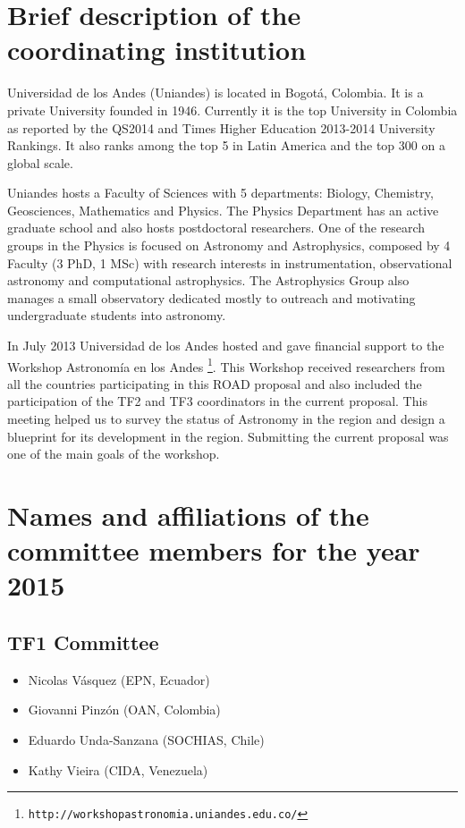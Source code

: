 \documentclass[12pt]{article}
\begin{document}
\section{Brief description of the coordinating institution}

Universidad de los Andes (Uniandes) is located in Bogotá, Colombia. It
is a private University founded in 1946. Currently it is the top
University in Colombia as reported by the QS2014 and Times
Higher Education 2013-2014 University Rankings. It also ranks among
the top 5 in Latin America and the top 300 on a global scale.    

Uniandes hosts a Faculty of Sciences with 5 departments: Biology,
Chemistry, Geosciences, Mathematics and Physics. The Physics
Department has an active graduate school and also hosts postdoctoral
researchers. One of the research groups in the Physics is focused on
Astronomy and Astrophysics, composed by 4 Faculty (3 PhD, 1 MSc) with
research interests in instrumentation, observational astronomy and
computational astrophysics. The Astrophysics Group also manages a
small observatory dedicated mostly to outreach and motivating
undergraduate students into astronomy. 

In July 2013 Universidad de los Andes hosted and gave financial
support to the Workshop Astronomía en los
Andes \footnote{\texttt{http://workshopastronomia.uniandes.edu.co/}}. This
Workshop received researchers from all the countries participating in
this ROAD proposal and also included the participation of the TF2 and
TF3 coordinators in the current proposal. This meeting helped us to
survey the status of Astronomy in the region and design a blueprint
for its development in the region. Submitting the current proposal was
one of the main goals of the workshop. 
 
\newpage



\section{Names and affiliations of the committee members for the year 2015}

\subsection*{TF1 Committee}
\begin{itemize}
\item Nicolas V\'asquez (EPN, Ecuador)
\item Giovanni Pinz\'on (OAN, Colombia)
\item Eduardo Unda-Sanzana (SOCHIAS, Chile)
\item Kathy Vieira (CIDA, Venezuela)
\end{itemize}
\end{document}
